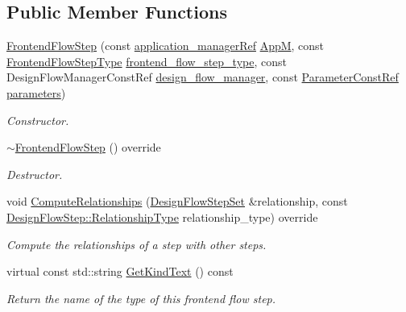 \subsection*{Public Member Functions}
\begin{DoxyCompactItemize}
\item 
\hyperlink{classFrontendFlowStep_ac85d0661dfc22d982cc8abcaac10b2ae}{Frontend\+Flow\+Step} (const \hyperlink{application__manager_8hpp_a04ccad4e5ee401e8934306672082c180}{application\+\_\+manager\+Ref} \hyperlink{classFrontendFlowStep_a0ac0d8db2a378416583f51c4faa59d15}{AppM}, const \hyperlink{frontend__flow__step_8hpp_afeb3716c693d2b2e4ed3e6d04c3b63bb}{Frontend\+Flow\+Step\+Type} \hyperlink{classFrontendFlowStep_ad49067d6a17119d47316149ab757b60d}{frontend\+\_\+flow\+\_\+step\+\_\+type}, const Design\+Flow\+Manager\+Const\+Ref \hyperlink{classDesignFlowStep_ab770677ddf087613add30024e16a5554}{design\+\_\+flow\+\_\+manager}, const \hyperlink{Parameter_8hpp_a37841774a6fcb479b597fdf8955eb4ea}{Parameter\+Const\+Ref} \hyperlink{classDesignFlowStep_a802eaafe8013df706370679d1a436949}{parameters})
\begin{DoxyCompactList}\small\item\em Constructor. \end{DoxyCompactList}\item 
\hyperlink{classFrontendFlowStep_aa7a56912287bccb3c1c9df2a9be1a82c}{$\sim$\+Frontend\+Flow\+Step} () override
\begin{DoxyCompactList}\small\item\em Destructor. \end{DoxyCompactList}\item 
void \hyperlink{classFrontendFlowStep_a532ee0d76d7a10c373b4a7478a7eee18}{Compute\+Relationships} (\hyperlink{classDesignFlowStepSet}{Design\+Flow\+Step\+Set} \&relationship, const \hyperlink{classDesignFlowStep_a723a3baf19ff2ceb77bc13e099d0b1b7}{Design\+Flow\+Step\+::\+Relationship\+Type} relationship\+\_\+type) override
\begin{DoxyCompactList}\small\item\em Compute the relationships of a step with other steps. \end{DoxyCompactList}\item 
virtual const std\+::string \hyperlink{classFrontendFlowStep_a264285918b0d8ea193eb1c2f3af17ef4}{Get\+Kind\+Text} () const
\begin{DoxyCompactList}\small\item\em Return the name of the type of this frontend flow step. \end{DoxyCompactList}\item 

\end{DoxyCompactItemize}
